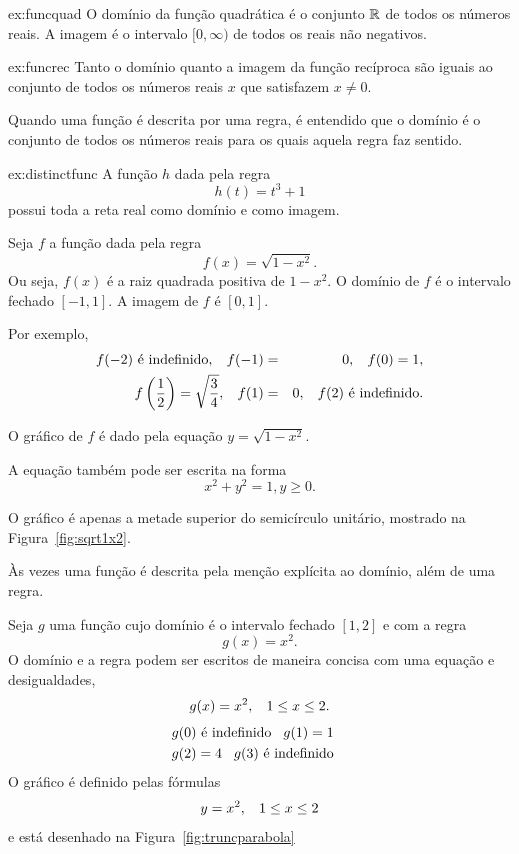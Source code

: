 \begin{examplecont}{ex:funcquad}
O domínio da função quadrática é o conjunto $\mathbb{R}$ de todos os números
reais. A imagem é o intervalo $[0,\infty)$ de todos os reais não negativos.
\end{examplecont}

\begin{examplecont}{ex:funcrec}
Tanto o domínio quanto a imagem da função recíproca são iguais ao
conjunto de todos os números reais $x$ que satisfazem $x \ne 0$.
\end{examplecont}

Quando uma função é descrita por uma regra, é entendido que o domínio
é o conjunto de todos os números reais para os quais aquela regra faz
sentido.

\begin{examplecont}{ex:distinctfunc}
A função $h$ dada pela regra
\[
  h(t) = t^3 + 1
\]
possui toda a reta real como domínio e como imagem.
\end{examplecont}

\begin{example}
\label{ex:sqrt1x2}
Seja $f$ a função dada pela regra
\[
  f(x) = \sqrt{1 - x^2}.
\]
Ou seja, $f(x)$ é a raiz quadrada positiva de $1 - x^2$. O domínio
de $f$ é o intervalo fechado $[-1,1]$. A imagem de $f$ é $[0,1]$.

Por exemplo,
\begin{eqnarray*}
\textstyle
  f(-2) \text{ é indefinido}, \hspace{2ex} f(-1) & = & 0, \hspace{2ex} f(0) = 1, \\
  f\left(\frac{1}{2}\right) = \sqrt{\frac{3}{4}}, \hspace{2ex} f(1) & = & 0,
                                   \hspace{2ex} f(2) \text{ é indefinido}.
\end{eqnarray*}

O gráfico de $f$ é dado pela equação $y = \sqrt{1-x^2}$.

A equação também pode ser escrita na forma
\[
  x^2 + y^2 = 1, y \ge 0.
\]

O gráfico é apenas a metade superior do semicírculo unitário, mostrado
na Figura~\ref{fig:sqrt1x2}.
\end{example}


Às vezes uma função é descrita pela menção explícita ao domínio, além
de uma regra.

\begin{example}
Seja $g$ uma função cujo domínio é o intervalo fechado $[1,2]$ e com
a regra
\[
  g(x) = x^2.
\]
O domínio e a regra podem ser escritos de maneira concisa com uma
equação e desigualdades,
\[
  g(x) = x^2, \hspace{2ex} 1 \le x \le 2.
\]
\begin{eqnarray*}
   & g(0) \text{ é indefinido} \hspace{2ex} g(1) = 1 & \\
   & g(2) = 4 \hspace{2ex} g(3) \text{ é indefinido} &
\end{eqnarray*}
O gráfico é definido pelas fórmulas
\[
   y = x^2, \hspace{2ex} 1 \le x \le 2
\]
e está desenhado na Figura~\ref{fig:truncparabola}
\end{example}

